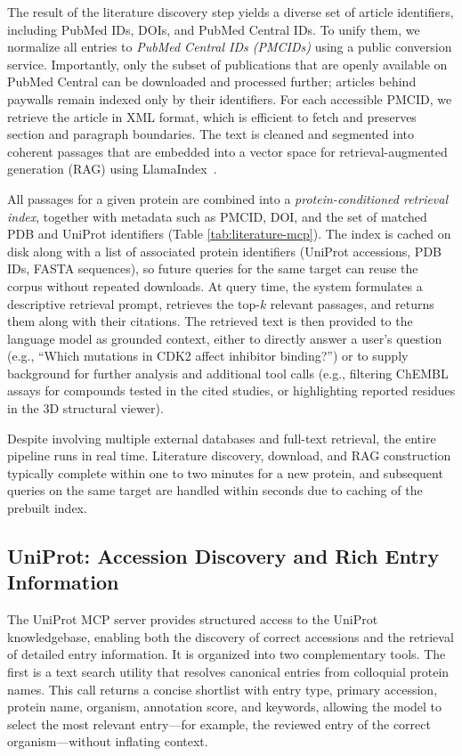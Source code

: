 \documentclass{article}
\begin{document}
The result of the literature discovery step yields a diverse set of article identifiers, including PubMed IDs, DOIs, and PubMed Central IDs. To unify them, we normalize all entries to \emph{PubMed Central IDs (PMCIDs)} using a public conversion service. Importantly, only the subset of publications that are openly available on PubMed Central can be downloaded and processed further; articles behind paywalls remain indexed only by their identifiers. For each accessible PMCID, we retrieve the article in XML format, which is efficient to fetch and preserves section and paragraph boundaries. The text is cleaned and segmented into coherent passages that are embedded into a vector space for retrieval-augmented generation (RAG) using LlamaIndex~\citep{Liu_LlamaIndex_2022}.

All passages for a given protein are combined into a \emph{protein-conditioned retrieval index}, together with metadata such as PMCID, DOI, and the set of matched PDB and UniProt identifiers (Table \ref{tab:literature-mcp}). The index is cached on disk along with a list of associated protein identifiers (UniProt accessions, PDB IDs, FASTA sequences), so future queries for the same target can reuse the corpus without repeated downloads. At query time, the system formulates a descriptive retrieval prompt, retrieves the top-$k$ relevant passages, and returns them along with their citations. The retrieved text is then provided to the language model as grounded context, either to directly answer a user’s question (e.g., “Which mutations in CDK2 affect inhibitor binding?”) or to supply background for further analysis and additional tool calls (e.g., filtering ChEMBL assays for compounds tested in the cited studies, or highlighting reported residues in the 3D structural viewer).

Despite involving multiple external databases and full-text retrieval, the entire pipeline runs in real time. Literature discovery, download, and RAG construction typically complete within one to two minutes for a new protein, and subsequent queries on the same target are handled within seconds due to caching of the prebuilt index.




\subsection{UniProt: Accession Discovery and Rich Entry Information}\label{sec:data:uniprot}
The UniProt MCP server provides structured access to the UniProt knowledgebase, enabling both the discovery of correct accessions and the retrieval of detailed entry information. It is organized into two complementary tools. The first is a text search utility that resolves canonical entries from colloquial protein names. This call returns a concise shortlist with entry type, primary accession, protein name, organism, annotation score, and keywords, allowing the model to select the most relevant entry—for example, the reviewed entry of the correct organism—without inflating context.
\end{document}
